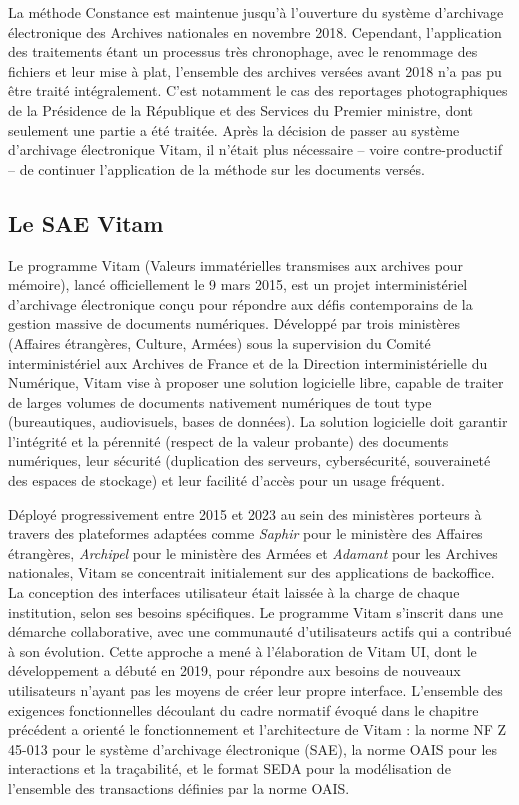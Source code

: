 La méthode Constance est maintenue jusqu’à l’ouverture du système d'archivage électronique des Archives nationales en novembre 2018. Cependant, l'application des traitements étant un processus très chronophage, avec le renommage des fichiers et leur mise à plat, l'ensemble des archives versées avant 2018 n'a pas pu être traité intégralement. C'est notamment le cas des reportages photographiques de la Présidence de la République et des Services du Premier ministre, dont seulement une partie a été traitée. Après la décision de passer au système d'archivage électronique Vitam, il n'était plus nécessaire -- voire contre-productif -- de continuer l'application de la méthode sur les documents versés.

\subsection*{Le SAE Vitam}

Le programme Vitam (Valeurs immatérielles transmises aux archives pour mémoire), lancé officiellement le 9 mars 2015, est un projet interministériel d’archivage électronique conçu pour répondre aux défis contemporains de la gestion massive de documents numériques. Développé par trois ministères (Affaires étrangères, Culture, Armées) sous la supervision du Comité interministériel aux Archives de France et de la Direction interministérielle du Numérique, Vitam vise à proposer une solution logicielle libre, capable de traiter de larges volumes de documents nativement numériques de tout type (bureautiques, audiovisuels, bases de données). La solution logicielle doit garantir l'intégrité et la pérennité (respect de la valeur probante) des documents numériques, leur sécurité (duplication des serveurs, cybersécurité, souveraineté des espaces de stockage) et leur facilité d’accès pour un usage fréquent. 

Déployé progressivement entre 2015 et 2023 au sein des ministères porteurs à travers des plateformes adaptées comme \emph{Saphir} pour le ministère des Affaires étrangères, \emph{Archipel} pour le ministère des Armées et \emph{Adamant} pour les Archives nationales, Vitam se concentrait initialement sur des applications de backoffice. La conception des interfaces utilisateur était laissée à la charge de chaque institution, selon ses besoins spécifiques. Le programme Vitam s’inscrit dans une démarche collaborative, avec une communauté d’utilisateurs actifs qui a contribué à son évolution. Cette approche a mené à l’élaboration de Vitam UI, dont le développement a débuté en 2019, pour répondre aux besoins de nouveaux utilisateurs n'ayant pas les moyens de créer leur propre interface. L’ensemble des exigences fonctionnelles découlant du cadre normatif évoqué dans le chapitre précédent a orienté le fonctionnement et l’architecture de Vitam : la norme NF Z 45-013 pour le système d’archivage électronique (SAE), la norme OAIS pour les interactions et la traçabilité, et le format SEDA pour la modélisation de l'ensemble des transactions définies par la norme OAIS.

